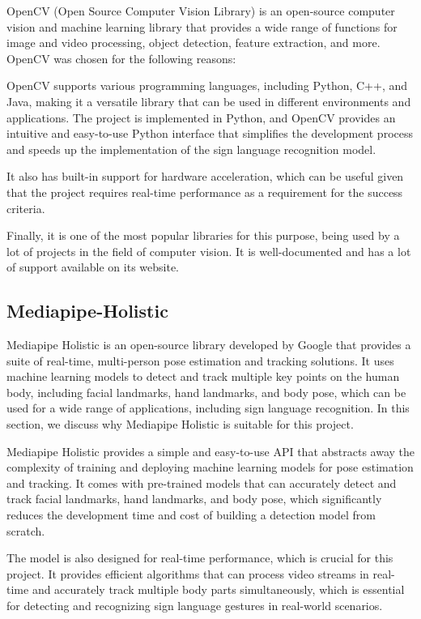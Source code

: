 \documentclass[final,rdr32.tex]{subfiles}
\begin{document}
OpenCV (Open Source Computer Vision Library) is an open-source computer vision and machine learning library that provides a wide range of functions for image and video processing, object detection, feature extraction, and more. OpenCV was chosen for the following reasons:

OpenCV supports various programming languages, including Python, C++, and Java, making it a versatile library that can be used in different environments and applications. The project is implemented in Python, and OpenCV provides an intuitive and easy-to-use Python interface that simplifies the development process and speeds up the implementation of the sign language recognition model.

It also has built-in support for hardware acceleration, which can be useful given that the project requires real-time performance as a requirement for the success criteria.

Finally, it is one of the most popular libraries for this purpose, being used by a lot of projects in the field of computer vision. It is well-documented and has a lot of support available on its website.

\subsection{Mediapipe-Holistic}

Mediapipe Holistic is an open-source library developed by Google that provides a suite of real-time, multi-person pose estimation and tracking solutions. It uses machine learning models to detect and track multiple key points on the human body, including facial landmarks, hand landmarks, and body pose, which can be used for a wide range of applications, including sign language recognition. In this section, we discuss why Mediapipe Holistic is suitable for this project.

Mediapipe Holistic provides a simple and easy-to-use API that abstracts away the complexity of training and deploying machine learning models for pose estimation and tracking. It comes with pre-trained models that can accurately detect and track facial landmarks, hand landmarks, and body pose, which significantly reduces the development time and cost of building a detection model from scratch.

The model is also designed for real-time performance, which is crucial for this project. It provides efficient algorithms that can process video streams in real-time and accurately track multiple body parts simultaneously, which is essential for detecting and recognizing sign language gestures in real-world scenarios.
\end{document}
